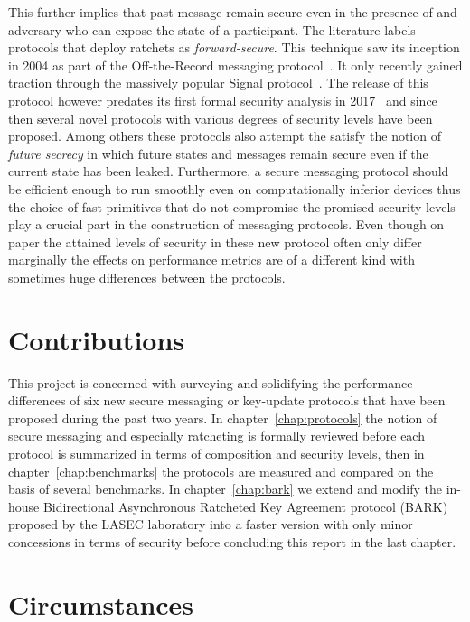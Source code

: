 \documentclass[11pt,a4paper,twoside,openright,bibliography=totoc]{scrbook}
\begin{document}
This further implies that
past message remain secure even in the presence of and adversary who
can expose the state of a participant. The literature labels protocols
that deploy ratchets as \textit{forward-secure}. This technique saw
its inception in 2004 as part of the Off-the-Record messaging
protocol~\cite{borisov2004off}. It only recently gained traction
through the massively popular Signal protocol~\cite{perrin2016double}.
The release of this protocol however predates its first formal
security analysis in 2017~\cite{cohn2017formal}
and since then several novel protocols with various degrees of
security levels have been proposed. Among others
these protocols also attempt the satisfy the notion of \textit{future
secrecy} in which future states and messages remain secure even if the
current state has been leaked. Furthermore, a secure messaging
protocol should be efficient enough to run smoothly even on
computationally inferior devices thus the choice of fast primitives
that do not compromise the promised security levels play a crucial
part in the construction of messaging protocols. Even though on paper
the attained levels of security in these new protocol often only
differ marginally the effects on performance metrics are of a
different kind with sometimes huge differences between the protocols.


\section{Contributions}
\label{sec:contributions}

This project is concerned with surveying and solidifying the
performance differences of six new secure messaging or key-update
protocols that have been proposed during the past two years. In
chapter~\ref{chap:protocols} the notion of secure messaging and
especially ratcheting is formally reviewed before each protocol is
summarized in terms of composition and security levels, then in
chapter~\ref{chap:benchmarks} the protocols are measured and compared
on the basis of several benchmarks. In chapter~\ref{chap:bark} we
extend and modify the in-house Bidirectional Asynchronous Ratcheted
Key Agreement protocol (BARK) proposed by the LASEC laboratory into a
faster version with only minor concessions in terms of security before
concluding this report in the last chapter.

\section{Circumstances}
\label{sec:circumstances}
\end{document}
